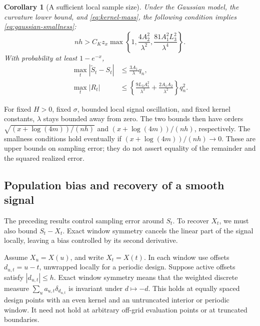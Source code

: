 \documentclass[11pt]{article}
\newtheorem{corollary}[proposition]{Corollary}
\begin{document}
\begin{corollary}[A sufficient local sample size]\label{cor:sample-size}
Under the Gaussian model, the curvature lower bound, and
\eqref{eq:kernel-mass}, the following condition implies
\eqref{eq:gaussian-smallness}:
\begin{equation}
  nh>C_Kz_x\max\left\{
       1,\frac{4A_2^2}{\lambda^2},
       \frac{81A_1^2L_3^2}{\lambda^4}\right\}.
  \label{eq:sample-size-condition}
\end{equation}
With probability at least \(1-e^{-x}\),
\begin{align}
  \max_t|\widetilde S_t-S_t|
    &\leq\frac{3A_1}{\lambda}q_n,
      \label{eq:raw-rate}\\
  \max_t|R_t|
    &\leq\left\{\frac{9L_3A_1^2}{\lambda^3}
                 +\frac{2A_1A_2}{\lambda^2}\right\}q_n^2.
      \label{eq:remainder-rate}
\end{align}
\end{corollary}


For fixed \(H>0\), fixed \(\sigma\), bounded local signal oscillation, and
fixed kernel constants, \(\lambda\) stays bounded away from zero.  The two
bounds then have orders \(\sqrt{(x+\log(4m))/(nh)}\) and
\((x+\log(4m))/(nh)\), respectively.  The smallness conditions hold eventually
if \((x+\log(4m))/(nh)\to0\).  These are upper bounds on sampling error;
they do not assert equality of the remainder and the squared realized error.

\subsection{Population bias and recovery of a smooth signal}\label{sec:bias}

The preceding results control sampling error around \(S_t\).  To recover
\(X_t\), we must also bound \(S_t-X_t\).  Exact window symmetry cancels the
linear part of the signal locally, leaving a bias controlled by its second
derivative.

Assume \(X_u=X(u)\), and write \(X_t=X(t)\).  In each window use offsets
\(d_{u,t}=u-t\), unwrapped locally for a periodic design.  Suppose active
offsets satisfy \(|d_{u,t}|\leq h\).  Exact window symmetry means that the
weighted discrete measure \(\sum_u a_{u,t}\delta_{d_{u,t}}\) is invariant under
\(d\mapsto-d\).  This holds at equally spaced design points with an even
kernel and an untruncated interior or periodic window.  It need not hold at
arbitrary off-grid evaluation points or at truncated boundaries.
\end{document}
